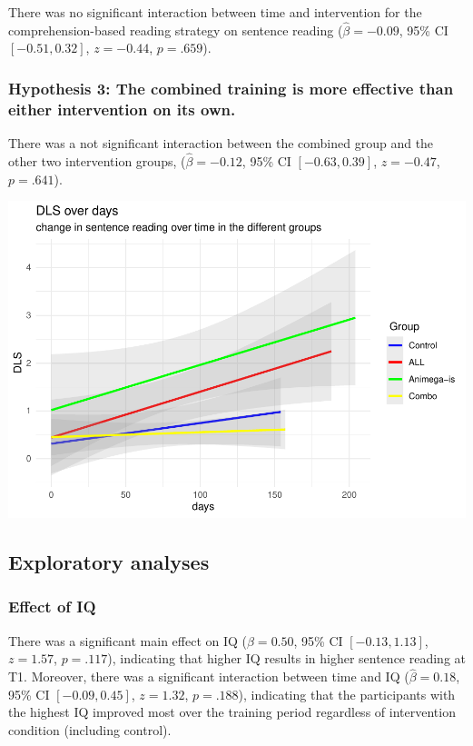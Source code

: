 \documentclass[
  english,
  ,man]{apa6}
\begin{document}
There was no significant interaction between time and intervention for the comprehension-based reading strategy on sentence reading (\(\hat{\beta} = -0.09\), 95\% CI \([-0.51, 0.32]\), \(z = -0.44\), \(p = .659\)).

\hypertarget{hypothesis-3-the-combined-training-is-more-effective-than-either-intervention-on-its-own.-2}{%
\subsubsection{Hypothesis 3: The combined training is more effective than either intervention on its own.}\label{hypothesis-3-the-combined-training-is-more-effective-than-either-intervention-on-its-own.-2}}

There was a not significant interaction between the combined group and the other two intervention groups, (\(\hat{\beta} = -0.12\), 95\% CI \([-0.63, 0.39]\), \(z = -0.47\), \(p = .641\)).

\includegraphics{Effects_of_training_files/figure-latex/DLS-plot-1.pdf}

\hypertarget{exploratory-analyses-2}{%
\subsection{Exploratory analyses}\label{exploratory-analyses-2}}

\hypertarget{effect-of-iq-2}{%
\subsubsection{Effect of IQ}\label{effect-of-iq-2}}

There was a significant main effect on IQ (\(\hat{\beta} = 0.50\), 95\% CI \([-0.13, 1.13]\), \(z = 1.57\), \(p = .117\)), indicating that higher IQ results in higher sentence reading at T1. Moreover, there was a significant interaction between time and IQ (\(\hat{\beta} = 0.18\), 95\% CI \([-0.09, 0.45]\), \(z = 1.32\), \(p = .188\)), indicating that the participants with the highest IQ improved most over the training period regardless of intervention condition (including control).
\end{document}

